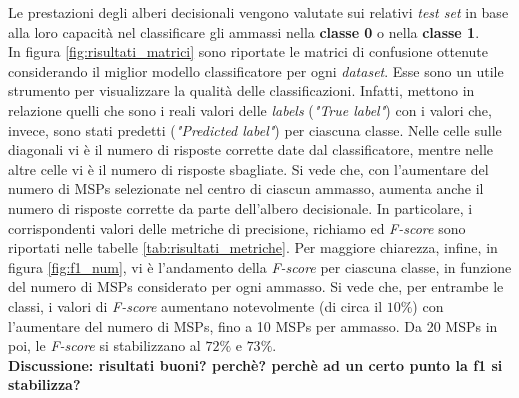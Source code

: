 Le prestazioni degli alberi decisionali vengono valutate sui relativi \textit{test set} in base alla loro capacità nel classificare gli ammassi nella \textbf{classe 0} o nella \textbf{classe 1}.\\
In figura \ref{fig:risultati_matrici} sono riportate le matrici di confusione ottenute considerando il miglior modello classificatore per ogni \textit{dataset}. Esse sono un utile strumento per visualizzare la qualità delle classificazioni. Infatti, mettono in relazione quelli che sono i reali valori delle \textit{labels} (\textit{"True label"}) con i valori che, invece, sono stati predetti (\textit{"Predicted label"}) per ciascuna classe. Nelle celle sulle diagonali vi è il numero di risposte corrette date dal classificatore, mentre nelle altre celle vi è il numero di risposte sbagliate. Si vede che, con l'aumentare del numero di MSPs selezionate nel centro di ciascun ammasso, aumenta anche il numero di risposte corrette da parte dell'albero decisionale. In particolare, i corrispondenti valori delle metriche di precisione, richiamo ed \textit{F-score} sono riportati nelle tabelle \ref{tab:risultati_metriche}.
Per maggiore chiarezza, infine, in figura \ref{fig:f1_num}, vi è l'andamento della \textit{F-score} per ciascuna classe, in funzione del numero di MSPs considerato per ogni ammasso. Si vede che, per entrambe le classi, i valori di \textit{F-score} aumentano notevolmente (di circa il $10\%$) con l'aumentare del numero di MSPs, fino a 10 MSPs per ammasso. Da 20 MSPs in poi, le \textit{F-score} si stabilizzano al $72\%$ e $73\%$.\\
\textbf{Discussione: risultati buoni? perchè? perchè ad un certo punto la f1 si stabilizza?}

